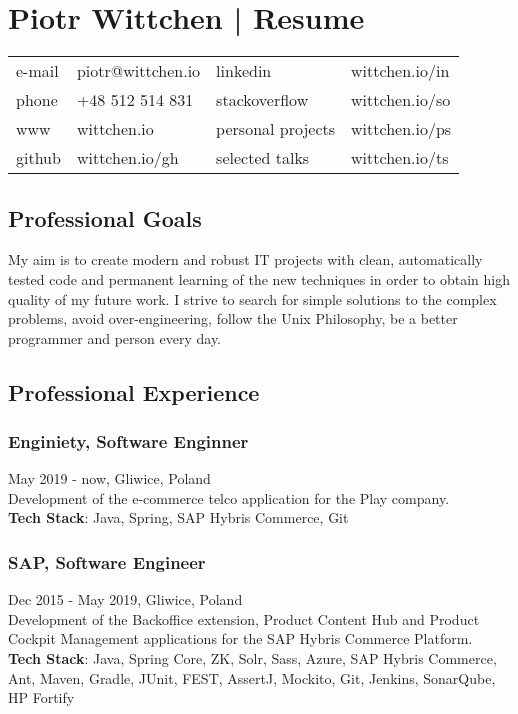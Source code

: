 \documentclass{article}
\begin{document}
  \section*{Piotr Wittchen | Resume}

  \begin{tabular}{llll}\small
    e-mail & piotr@wittchen.io & linkedin          & wittchen.io/in \\
    phone  & +48 512 514 831   & stackoverflow     & wittchen.io/so \\
    www    & wittchen.io       & personal projects & wittchen.io/ps \\
    github & wittchen.io/gh    & selected talks    & wittchen.io/ts \\
  \end{tabular}

    \subsection*{Professional Goals}
    \small{My aim is to create modern and robust IT projects with clean,
    automatically tested code and permanent learning of the new techniques
    in order to obtain high quality of my future work.
    I strive to search for simple solutions to the complex problems,
    avoid over-engineering, follow the Unix Philosophy,
    be a better programmer and person every day.}

    \subsection*{Professional Experience}

      \subsubsection*{Enginiety, Software Enginner}
      May 2019 - now, Gliwice, Poland\\[0.3em] 
      Development of the e-commerce telco application for the Play company.\\
      \textbf{Tech Stack}: Java, Spring, SAP Hybris Commerce, Git

      \subsubsection*{SAP, Software Engineer} 
      Dec 2015 - May 2019, Gliwice, Poland\\[0.3em]
      Development of the Backoffice extension, Product Content Hub 
      and Product Cockpit Management applications for the SAP Hybris Commerce Platform.\\
      \textbf{Tech Stack}: Java, Spring Core, ZK, Solr, Sass, Azure, 
      SAP Hybris Commerce, Ant, Maven, Gradle, JUnit, FEST, AssertJ, 
      Mockito, Git, Jenkins, SonarQube, HP Fortify
\end{document}
